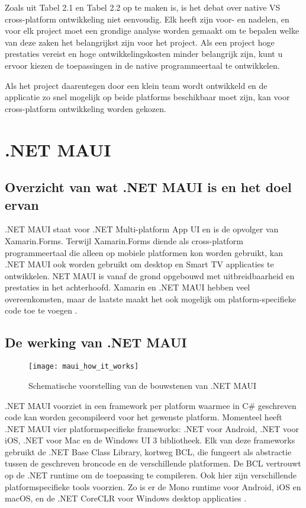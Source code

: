 Zoals uit Tabel 2.1 \textcite{KotlinFoundation2023} en Tabel 2.2 \textcite{KotlinFoundation2023} op te maken is, is het debat over native VS cross-platform ontwikkeling niet eenvoudig. Elk heeft zijn voor- en nadelen, en voor elk project moet een grondige analyse worden gemaakt om te bepalen welke van deze zaken het belangrijkst zijn voor het project. Als een project hoge prestaties vereist en hoge ontwikkelingskosten minder belangrijk zijn, kunt u ervoor kiezen de toepassingen in de native programmeertaal te ontwikkelen.

Als het project daarentegen door een klein team wordt ontwikkeld en de applicatie zo snel mogelijk op beide platforms beschikbaar moet zijn, kan voor cross-platform ontwikkeling worden gekozen.

\section{.NET MAUI}
\subsection{Overzicht van wat .NET MAUI is en het doel ervan}
.NET MAUI staat voor .NET Multi-platform App UI en is de opvolger van Xamarin.Forms. Terwijl Xamarin.Forms diende als cross-platform programmeertaal die alleen op mobiele platformen kon worden gebruikt, kan .NET MAUI ook worden gebruikt om desktop en Smart TV applicaties te ontwikkelen. NET MAUI is vanaf de grond opgebouwd met uitbreidbaarheid en prestaties in het achterhoofd. Xamarin en .NET MAUI hebben veel overeenkomsten, maar de laatste maakt het ook mogelijk om platform-specifieke code toe te voegen \autocite{BradyGaster2020}.

\subsection{De werking van .NET MAUI}
\begin{figure}
    \texttt{[image: maui\_how\_it\_works]}
    \centering
    \caption{Schematische voorstelling van de bouwstenen van .NET MAUI}
    \label{fig:mauiCompilationScheme}
\end{figure}
.NET MAUI voorziet in een framework per platform waarmee in C\# geschreven code kan worden gecompileerd voor het gewenste platform. Momenteel heeft .NET MAUI vier platformspecifieke frameworks: .NET voor Android, .NET voor iOS, .NET voor Mac en de Windows UI 3 bibliotheek. Elk van deze frameworks gebruikt de .NET Base Class Library, kortweg BCL, die fungeert als abstractie tussen de geschreven broncode en de verschillende platformen. De BCL vertrouwt op de .NET runtime om de toepassing te compileren. Ook hier zijn verschillende platformspecifieke tools voorzien. Zo is er de Mono runtime voor Android, iOS en macOS, en de .NET CoreCLR voor Windows desktop applicaties \autocite{Britch2023}.


